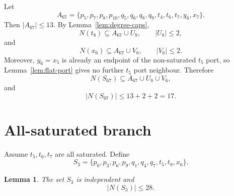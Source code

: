 \documentclass[11pt]{article}
\newtheorem{lemma}{Lemma}
\begin{document}
Let
\[
A_{67}=\{p_5,p_7,p_8,p_{10},q_5,q_6,q_8,q_9,t_4,t_6,t_7,y_6,x_7\}.
\]
Then $|A_{67}|\le13$. By Lemma~\ref{lem:degree-caps},
\[
  N(t_8)\subseteq A_{67}\cup U_8,
  \qquad |U_8|\le2,
\]
and
\[
  N(x_6)\subseteq A_{67}\cup V_6,
  \qquad |V_6|\le2.
\]
Moreover, $y_6=x_5$ is already an endpoint of the non-saturated $t_5$ port, so Lemma~\ref{lem:flat-port} gives no further $t_5$ port neighbour. Therefore
\[
N(S_{67})\subseteq A_{67}\cup U_8\cup V_6,
\]
and
\[
  |N(S_{67})|\le13+2+2=17.
\]

\section{All-saturated branch}

Assume $t_5,t_6,t_7$ are all saturated. Define
\[
  S_3=\{p_0,p_3,p_6,p_9,q_1,q_4,q_7,t_5,t_8,x_6\}.
\]

\begin{lemma}\label{lem:S3}
The set $S_3$ is independent and
\[
  |N(S_3)|\le28.
\]
\end{lemma}
\end{document}
